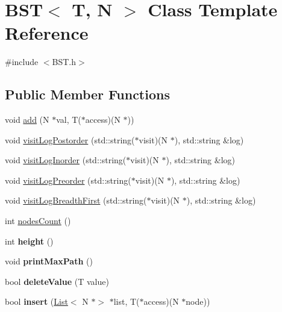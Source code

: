 \hypertarget{class_b_s_t}{}\section{B\+ST$<$ T, N $>$ Class Template Reference}
\label{class_b_s_t}


{\ttfamily \#include $<$B\+S\+T.\+h$>$}

\subsection*{Public Member Functions}
\begin{DoxyCompactItemize}
\item 
void \hyperlink{class_b_s_t_afc990532c54fba36b8501836b1834ac6}{add} (N $\ast$val, T($\ast$access)(N $\ast$))
\item 
void \hyperlink{class_b_s_t_a831b6fdcda13b7a353e03992b9c965b7}{visit\+Log\+Postorder} (std\+::string($\ast$visit)(N $\ast$), std\+::string \&log)
\item 
void \hyperlink{class_b_s_t_a04d669d91c9528c61f618d022999ea26}{visit\+Log\+Inorder} (std\+::string($\ast$visit)(N $\ast$), std\+::string \&log)
\item 
void \hyperlink{class_b_s_t_a7ed3924d6f70e52c7a6bc1d5bddbb31d}{visit\+Log\+Preorder} (std\+::string($\ast$visit)(N $\ast$), std\+::string \&log)
\item 
void \hyperlink{class_b_s_t_a3e958de8a85c1268b11006a3ed32a7bb}{visit\+Log\+Breadth\+First} (std\+::string($\ast$visit)(N $\ast$), std\+::string \&log)
\item 
int \hyperlink{class_b_s_t_a86fb81e20a21ef65e2b57e55d910d875}{nodes\+Count} ()
\item 
\mbox{\label{class_b_s_t_a84bfd35b9fdf74574ffcac8b33a129b3}} 
int {\bfseries height} ()
\item 
\mbox{\label{class_b_s_t_abd50732adeb88dbb562a640d06a0c25f}} 
void {\bfseries print\+Max\+Path} ()
\item 
\mbox{\label{class_b_s_t_a7490ec3a95cd5a9db735b3a2e7023baf}} 
bool {\bfseries delete\+Value} (T value)
\item 
\mbox{\label{class_b_s_t_a69e01758890117297b34b79317c7c112}} 
bool {\bfseries insert} (\hyperlink{class_list}{List}$<$ N $\ast$$>$ $\ast$list, T($\ast$access)(N $\ast$node))
\end{DoxyCompactItemize}


